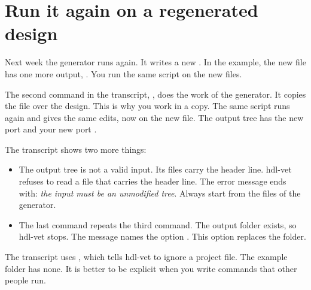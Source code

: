 \section{Run it again on a regenerated design}

Next week the generator runs again. It writes a new . In the
example, the new file has one more output, . You run the same
script on the new files.



The second command in the transcript, , does the work of the generator.
It copies the file  over the design. This is why you
work in a copy. The same script runs again and gives the same edits, now on the new
file. The output tree has the new port  and your new port .

The transcript shows two more things:

\begin{itemize}
\item The output tree is not a valid input. Its files carry the header line.
  hdl-vet refuses to read a file that carries the header line. The error message
  ends with: \emph{the input must be an unmodified tree}. Always start from the files
  of the generator.
\item The last command repeats the third command. The output folder
   exists, so hdl-vet stops. The message names the option
  . This option replaces the folder.
\end{itemize}

The transcript uses , which tells hdl-vet to ignore a project
file. The example folder has none. It is better to be explicit when you write
commands that other people run.
